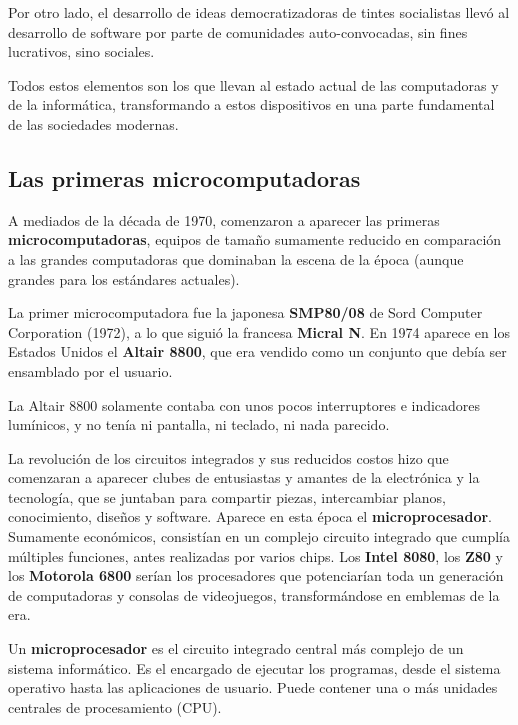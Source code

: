 Por otro lado, el desarrollo de ideas democratizadoras de tintes socialistas
llevó al desarrollo de software por parte de comunidades auto-convocadas, sin
fines lucrativos, sino sociales.

Todos estos elementos son los que llevan al estado actual de las computadoras
y de la informática, transformando a estos dispositivos en una parte fundamental
de las sociedades modernas.

\subsection{Las primeras microcomputadoras}

A mediados de la década de 1970, comenzaron a aparecer las primeras
\textbf{microcomputadoras}, equipos de tamaño sumamente reducido en comparación
a las grandes computadoras que dominaban la escena de la época (aunque
grandes para los estándares actuales).

La primer microcomputadora fue la japonesa \textbf{SMP80/08} de Sord Computer
Corporation (1972), a lo que siguió la francesa \textbf{Micral N}.
En 1974 aparece en los Estados Unidos el \textbf{Altair 8800}, que era vendido
como un conjunto que debía ser ensamblado por el usuario.

\begin{knowwhat}
La Altair 8800 solamente contaba con unos pocos interruptores e indicadores
lumínicos, y no tenía ni pantalla, ni teclado, ni nada parecido.
\end{knowwhat}

La revolución de los circuitos integrados y sus reducidos costos hizo que
comenzaran a aparecer clubes de entusiastas y amantes de la electrónica y la
tecnología, que se juntaban para compartir piezas, intercambiar planos,
conocimiento, diseños y software. Aparece en esta época el \textbf{microprocesador}.
Sumamente económicos, consistían en un complejo circuito integrado que 
cumplía múltiples funciones, antes realizadas por varios chips. Los
\textbf{Intel 8080}, los \textbf{Z80} y los \textbf{Motorola 6800} serían los
procesadores que potenciarían toda un generación de computadoras y consolas
de videojuegos, transformándose en emblemas de la era.\autocite[cap. 4-6]{ceruzzi_2003}

\begin{definition}
    Un \textbf{microprocesador} es el circuito integrado central más complejo
    de un sistema informático. Es el encargado de ejecutar los programas, desde
    el sistema operativo hasta las aplicaciones de usuario. Puede contener una
    o más unidades centrales de procesamiento (CPU).
\end{definition}

